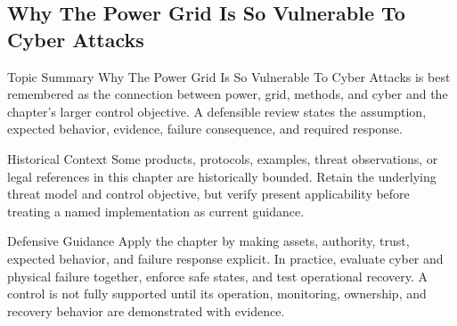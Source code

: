 \documentclass[11pt,letterpaper]{article}
\begin{document}
\subsection*{Why The Power Grid Is So Vulnerable To Cyber Attacks}
\begin{CornellNotesTable}
\end{CornellNotesTable}
\begin{CornellSummaryBox}{Topic Summary}
Why The Power Grid Is So Vulnerable To Cyber Attacks is best remembered as the connection between power, grid, methods, and cyber and the chapter's larger control objective. A defensible review states the assumption, expected behavior, evidence, failure consequence, and required response.
\end{CornellSummaryBox}
\begin{CornellWarningBox}{Historical Context}
Some products, protocols, examples, threat observations, or legal references in this chapter are historically bounded. Retain the underlying threat model and control objective, but verify present applicability before treating a named implementation as current guidance.
\end{CornellWarningBox}
\begin{CornellOverviewBox}{Defensive Guidance}
Apply the chapter by making assets, authority, trust, expected behavior, and failure response explicit. In practice, evaluate cyber and physical failure together, enforce safe states, and test operational recovery. A control is not fully supported until its operation, monitoring, ownership, and recovery behavior are demonstrated with evidence.
\end{CornellOverviewBox}
\end{document}
